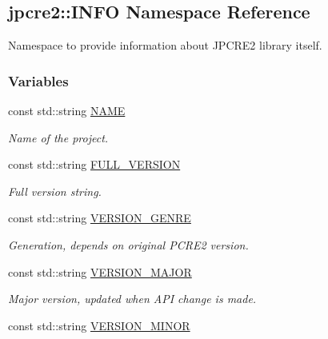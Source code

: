 \hypertarget{namespacejpcre2_1_1INFO}{}\subsection{jpcre2\+:\+:I\+N\+FO Namespace Reference}
\label{namespacejpcre2_1_1INFO}


Namespace to provide information about J\+P\+C\+R\+E2 library itself.  


\subsubsection*{Variables}
\begin{DoxyCompactItemize}
\item 
const std\+::string \hyperlink{namespacejpcre2_1_1INFO_a0d5716a82b496f2ccf5eee832275b4b8}{N\+A\+ME}
\begin{DoxyCompactList}\small\item\em Name of the project. \end{DoxyCompactList}\item 
const std\+::string \hyperlink{namespacejpcre2_1_1INFO_a315fc58da1463f4d1cc417677bd31ca1}{F\+U\+L\+L\+\_\+\+V\+E\+R\+S\+I\+ON}\hypertarget{namespacejpcre2_1_1INFO_a315fc58da1463f4d1cc417677bd31ca1}{}\label{namespacejpcre2_1_1INFO_a315fc58da1463f4d1cc417677bd31ca1}

\begin{DoxyCompactList}\small\item\em Full version string. \end{DoxyCompactList}\item 
const std\+::string \hyperlink{namespacejpcre2_1_1INFO_a9d046526610d624eaaa04b5fb000e48f}{V\+E\+R\+S\+I\+O\+N\+\_\+\+G\+E\+N\+RE}\hypertarget{namespacejpcre2_1_1INFO_a9d046526610d624eaaa04b5fb000e48f}{}\label{namespacejpcre2_1_1INFO_a9d046526610d624eaaa04b5fb000e48f}

\begin{DoxyCompactList}\small\item\em Generation, depends on original P\+C\+R\+E2 version. \end{DoxyCompactList}\item 
const std\+::string \hyperlink{namespacejpcre2_1_1INFO_a5deb805502c30063a5a68d91bf034d86}{V\+E\+R\+S\+I\+O\+N\+\_\+\+M\+A\+J\+OR}\hypertarget{namespacejpcre2_1_1INFO_a5deb805502c30063a5a68d91bf034d86}{}\label{namespacejpcre2_1_1INFO_a5deb805502c30063a5a68d91bf034d86}

\begin{DoxyCompactList}\small\item\em Major version, updated when A\+PI change is made. \end{DoxyCompactList}\item 
const std\+::string \hyperlink{namespacejpcre2_1_1INFO_a0644b3b2680e99fc88c0a98f6a0d25d1}{V\+E\+R\+S\+I\+O\+N\+\_\+\+M\+I\+N\+OR}\hypertarget{namespacejpcre2_1_1INFO_a0644b3b2680e99fc88c0a98f6a0d25d1}{}\label{namespacejpcre2_1_1INFO_a0644b3b2680e99fc88c0a98f6a0d25d1}


\end{DoxyCompactItemize}
